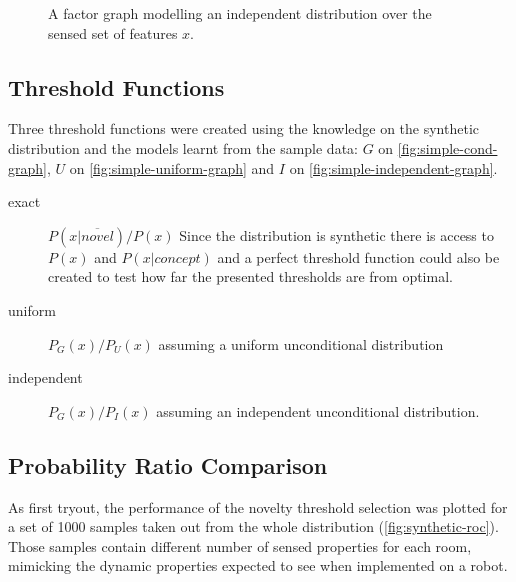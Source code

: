 \begin{figure}[h]
\centering
{}
\caption{\label{fig:simple-independent-graph}A factor graph modelling an
         independent distribution over the sensed set of features $x$.}
\end{figure}



\subsection{Threshold Functions}
Three threshold functions were created using the knowledge on the synthetic
distribution and the models learnt from the sample data:
$G$ on \autoref{fig:simple-cond-graph},
$U$ on \autoref{fig:simple-uniform-graph} and
$I$ on \autoref{fig:simple-independent-graph}.

\begin{description}
\item[exact]
$P(x|\overline{novel})/P(x)$
Since the distribution is synthetic there is access to $P(x)$ and $P(x|concept)$
and a perfect threshold function could also be created to test how far the
presented thresholds are from optimal.

\item[uniform]
$P_G(x)/P_U(x)$ assuming a uniform unconditional distribution

\item[independent]
$P_G(x)/P_I(x)$ assuming an independent unconditional distribution.
\end{description}


\subsection{Probability Ratio Comparison}
As first tryout, the performance of the novelty threshold selection was plotted for a set
of 1000 samples taken out from the whole distribution (\autoref{fig:synthetic-roc}).
Those samples contain different number of sensed properties for each room, mimicking
the dynamic properties expected to see when implemented on a robot.


